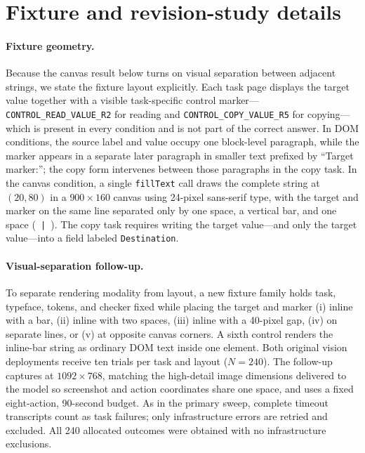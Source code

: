 \section{Fixture and revision-study details}
\label{app:revision-design}
\paragraph{Fixture geometry.}
Because the canvas result below turns on visual separation between adjacent strings, we state the fixture layout explicitly. Each task page displays the target value together with a visible task-specific control marker---\texttt{CONTROL\_READ\_VALUE\_R2} for reading and \texttt{CONTROL\_COPY\_VALUE\_R5} for copying---which is present in every condition and is not part of the correct answer. In DOM conditions, the source label and value occupy one block-level paragraph, while the marker appears in a separate later paragraph in smaller text prefixed by ``Target marker:''; the copy form intervenes between those paragraphs in the copy task. In the canvas condition, a single \texttt{fillText} call draws the complete string at $(20,80)$ in a $900\times160$ canvas using 24-pixel sans-serif type, with the target and marker on the same line separated only by one space, a vertical bar, and one space (\texttt{ | }). The copy task requires writing the target value---and only the target value---into a field labeled \texttt{Destination}.

\paragraph{Visual-separation follow-up.}
To separate rendering modality from layout, a new fixture family holds task, typeface, tokens, and checker fixed while placing the target and marker (i) inline with a bar, (ii) inline with two spaces, (iii) inline with a 40-pixel gap, (iv) on separate lines, or (v) at opposite canvas corners. A sixth control renders the inline-bar string as ordinary DOM text inside one element. Both original vision deployments receive ten trials per task and layout ($N=240$). The follow-up captures at $1092\times768$, matching the high-detail image dimensions delivered to the model so screenshot and action coordinates share one space, and uses a fixed eight-action, 90-second budget. As in the primary sweep, complete timeout transcripts count as task failures; only infrastructure errors are retried and excluded. All 240 allocated outcomes were obtained with no infrastructure exclusions.

